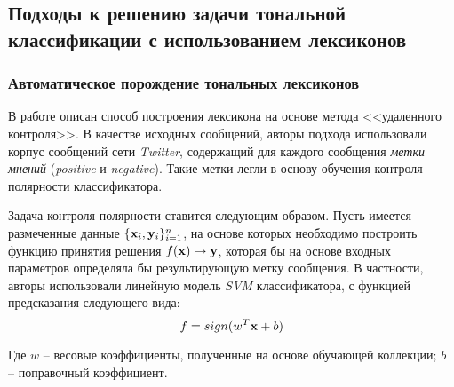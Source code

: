 \subsection{Подходы к решению задачи тональной классификации с использованием лексиконов}
    \subsubsection{Автоматическое порождение тональных лексиконов}
    В работе \cite{severyn} описан способ построения лексикона
    на основе метода <<удаленного контроля>>. В качестве исходных сообщений,
    авторы подхода использовали корпус сообщений сети {\it Twitter}, содержащий
    для каждого сообщения {\it метки мнений} ({\it positive} и {\it negative}).
    Такие метки легли в основу обучения контроля полярности классификатора.

    Задача контроля полярности ставится следующим образом. Пусть имеется
    размеченные данные $ \{{\bf x}_i, {\bf y}_i \}_{i=1}^{n}$, на основе
    которых необходимо построить функцию принятия решения
    $f({\bf x}) \to {\bf y}$, которая бы на основе входных параметров
    определяла бы результирующую метку сообщения.
    В частности, авторы использовали линейную модель {\it SVM} классификатора, с
    функцией предсказания следующего вида:
    \begin{equation}
        f = sign(w^T{\bf x} + b)
    \end{equation}

    Где $w$ -- весовые коэффициенты, полученные на основе обучающей коллекции;
    $b$ -- поправочный коэффициент.

